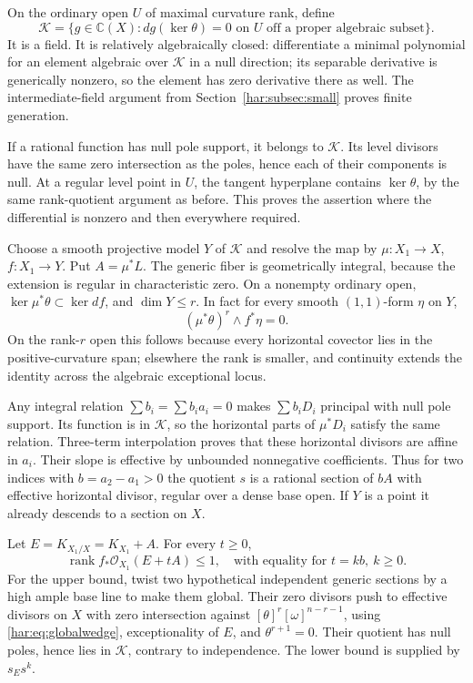 On the ordinary open \(U\) of maximal curvature rank, define
\[
 \mathcal K=\{g\in\mathbb C(X): dg(\ker\theta)=0
       \text{ on }U\text{ off a proper algebraic subset}\}.
\]
It is a field. It is relatively algebraically closed: differentiate a
minimal polynomial for an element algebraic over \(\mathcal K\) in a
null direction; its separable derivative is generically nonzero, so
the element has zero derivative there as well. The intermediate-field
argument from Section~\ref{har:subsec:small} proves finite generation.

If a rational function has null pole support, it belongs to
\(\mathcal K\). Its level divisors have the same zero intersection
as the poles, hence each of their components is null. At a regular
level point in \(U\), the tangent hyperplane contains \(\ker\theta\),
by the same rank-quotient argument as before. This proves the assertion
where the differential is nonzero and then everywhere required.

Choose a smooth projective model \(Y\) of \(\mathcal K\) and resolve
the map by \(\mu:X_1\to X\), \(f:X_1\to Y\). Put \(A=\mu^*L\).
The generic fiber is geometrically integral, because the extension
is regular in characteristic zero. On a nonempty ordinary open,
\(\ker\mu^*\theta\subset\ker df\), and \(\dim Y\le r\).
In fact for every smooth \((1,1)\)-form \(\eta\) on \(Y\),
\begin{equation}\label{har:eq:globalwedge}
 (\mu^*\theta)^r\wedge f^*\eta=0.
\end{equation}
On the rank-\(r\) open this follows because every horizontal
covector lies in the positive-curvature span; elsewhere the rank is
smaller, and continuity extends the identity across the algebraic
exceptional locus.

Any integral relation \(\sum b_i=\sum b_i a_i=0\) makes
\(\sum b_iD_i\) principal with null pole support. Its function is in
\(\mathcal K\), so the horizontal parts of \(\mu^*D_i\) satisfy the
same relation. Three-term interpolation proves that these horizontal
divisors are affine in \(a_i\). Their slope is effective by unbounded
nonnegative coefficients. Thus for two indices with \(b=a_2-a_1>0\)
the quotient \(s\) is a rational section of \(bA\) with effective
horizontal divisor, regular over a dense base open. If \(Y\) is a
point it already descends to a section on \(X\).

Let \(E=K_{X_1/X}=K_{X_1}+A\). For every \(t\ge0\),
\begin{equation}\label{har:eq:ordinaryrank}
 \operatorname{rank}f_*\mathcal O_{X_1}(E+tA)\le1,
 \quad\text{with equality for }t=kb,\ k\ge0.
\end{equation}
For the upper bound, twist two hypothetical independent generic
sections by a high ample base line to make them global. Their zero
divisors push to effective divisors on \(X\) with zero intersection
against \([\theta]^r[\omega]^{n-r-1}\), using
\eqref{har:eq:globalwedge}, exceptionality of \(E\), and
\(\theta^{r+1}=0\). Their quotient has null poles, hence lies in
\(\mathcal K\), contrary to independence. The lower bound is supplied
by \(s_Es^k\).

